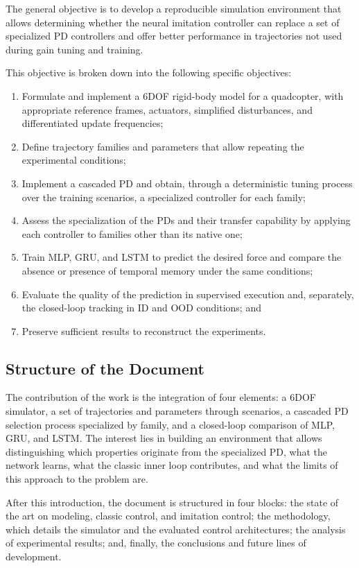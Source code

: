 The general objective is to develop a reproducible simulation environment that allows determining whether the neural imitation controller can replace a set of specialized PD controllers and offer better performance in trajectories not used during gain tuning and training.

This objective is broken down into the following specific objectives:

\begin{enumerate}
  \item Formulate and implement a 6DOF rigid-body model for a quadcopter, with appropriate reference frames, actuators, simplified disturbances, and differentiated update frequencies;
  \item Define trajectory families and parameters that allow repeating the experimental conditions;
  \item Implement a cascaded PD and obtain, through a deterministic tuning process over the training scenarios, a specialized controller for each family;
  \item Assess the specialization of the PDs and their transfer capability by applying each controller to families other than its native one;
  \item Train MLP, GRU, and LSTM to predict the desired force and compare the absence or presence of temporal memory under the same conditions;
  \item Evaluate the quality of the prediction in supervised execution and, separately, the closed-loop tracking in ID and OOD conditions; and
  \item Preserve sufficient results to reconstruct the experiments.
\end{enumerate}

\subsection{Structure of the Document}
\label{subsec:estructura-documento}

The contribution of the work is the integration of four elements: a 6DOF simulator, a set of trajectories and parameters through scenarios, a cascaded PD selection process specialized by family, and a closed-loop comparison of MLP, GRU, and LSTM. The interest lies in building an environment that allows distinguishing which properties originate from the specialized PD, what the network learns, what the classic inner loop contributes, and what the limits of this approach to the problem are.

After this introduction, the document is structured in four blocks: the state of the art on modeling, classic control, and imitation control; the methodology, which details the simulator and the evaluated control architectures; the analysis of experimental results; and, finally, the conclusions and future lines of development.
